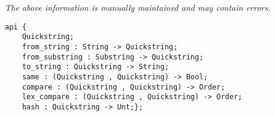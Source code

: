 \label{api:Quickstring}

{\tiny \it The above information is manually maintained and may contain errors.}
\begin{verbatim}
api {
    Quickstring;
    from_string : String -> Quickstring;
    from_substring : Substring -> Quickstring;
    to_string : Quickstring -> String;
    same : (Quickstring , Quickstring) -> Bool;
    compare : (Quickstring , Quickstring) -> Order;
    lex_compare : (Quickstring , Quickstring) -> Order;
    hash : Quickstring -> Unt;};
\end{verbatim}
